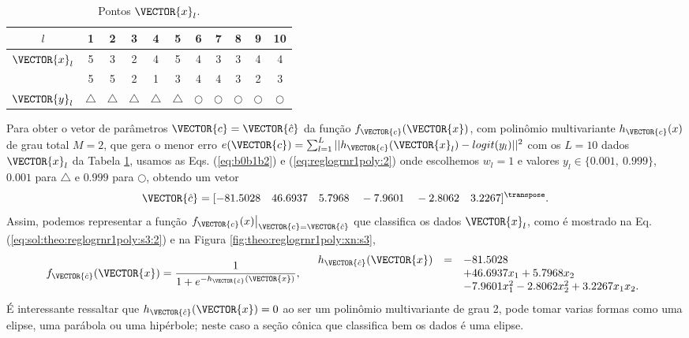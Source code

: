 \begin{table}[h!]
\centering
\begin{tabular}{|c||c|c|c|c|c||c|c|c|c|c||} 
 \hline
$l$            & 1 & 2 & 3 & 4 & 5 & 6 & 7 & 8 & 9 & 10 \\ \hline \hline
$\VECTOR{x}_l$ & 5 & 3 & 2 & 4 & 5 & 4 & 3 & 3 & 4 & 4 \\ 
~              & 5 & 5 & 2 & 1 & 3 & 4 & 4 & 3 & 2 & 3 \\ \hline
$\VECTOR{y}_l$ & $\bigtriangleup$ & $\bigtriangleup$ & $\bigtriangleup$ & $\bigtriangleup$ & $\bigtriangleup$ 
      & $\bigcirc$ & $\bigcirc$ & $\bigcirc$ & $\bigcirc$ & $\bigcirc$\\ \hline
\end{tabular}
\caption{Pontos $\VECTOR{x}_l$.}
\label{table:theo:reglogrnr1poly:ex2:xn}
\end{table}


\begin{SolutionT}\label{sol:theo:reglogrnr1poly:s3}
Para obter o vetor de parâmetros $\VECTOR{c}=\VECTOR{\hat{c}}$ da função $f_{\VECTOR{c}}(\VECTOR{x})$, 
com polinômio multivariante $h_{\VECTOR{c}}(x)$ de grau total $M=2$,
que gera o menor erro $e(\VECTOR{c}) =  \sum_{l=1}^{L} ||h_{\VECTOR{c}}(\VECTOR{x}_l)-logit(y_l)||^2$
com os $L=10$ dados $\VECTOR{x}_l$ da Tabela \ref{table:theo:reglogrnr1poly:ex2:xn},
usamos as Eqs. (\ref{eq:b0b1b2}) e  (\ref{eq:reglogrnr1poly:2}) onde escolhemos $w_l=1$ e valores $y_l \in \{0.001,~ 0.999\}$,
$0.001$ para $\bigtriangleup$ e $0.999$ para $\bigcirc$, 
obtendo um vetor 
\begin{equation}
\VECTOR{\hat{c}}=[-81.5028\quad 46.6937\quad 5.7968\quad -7.9601\quad -2.8062\quad 3.2267]^{\transpose}.
%                     
\end{equation}
Assim, podemos representar a função $\left.f_{\VECTOR{c}}(x)\right|_{\VECTOR{c}=\VECTOR{\hat{c}}}$
 que classifica os dados $\VECTOR{x}_l$, 
como é mostrado na Eq. (\ref{eq:sol:theo:reglogrnr1poly:s3:2}) e na Figura \ref{fig:theo:reglogrnr1poly:xn:s3},
\begin{equation}\label{eq:sol:theo:reglogrnr1poly:s3:2}
f_{\VECTOR{\hat{c}}}(\VECTOR{x})= \frac{1}{1+e^{-h_{\VECTOR{\hat{c}}}(\VECTOR{x})}},
\quad
\begin{array}{lll}
h_{\VECTOR{\hat{c}}}(\VECTOR{x}) & = & -81.5028\\
                         ~ & ~ & +46.6937 x_1 +5.7968 x_2 \\
                         ~ & ~ & -7.9601 x_1^2 -2.8062  x_2^2 + 3.2267 x_1 x_2.\\
\end{array}
\end{equation}
É interessante ressaltar que $h_{\VECTOR{\hat{c}}}(\VECTOR{x})=0$ ao ser um polinômio multivariante de grau 2,
pode tomar varias formas como uma elipse, uma parábola ou uma hipérbole;
neste caso a seção cônica que classifica bem os dados é uma elipse.
\end{SolutionT}

